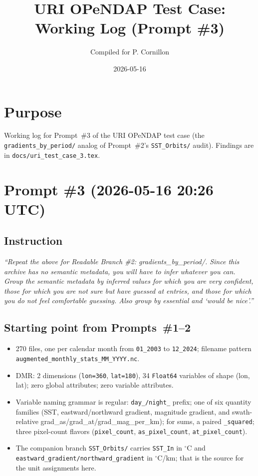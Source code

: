 \documentclass[11pt]{article}
\title{URI OPeNDAP Test Case: Working Log (Prompt \#3)}
\author{Compiled for P. Cornillon}
\date{2026-05-16}
\begin{document}
\maketitle

\section*{Purpose}

Working log for Prompt~\#3 of the URI OPeNDAP test case (the
\texttt{gradients\_by\_period/} analog of Prompt~\#2's
\texttt{SST\_Orbits/} audit). Findings are in
\texttt{docs/uri\_test\_case\_3.tex}.

\section{Prompt \#3 (2026-05-16 20:26 UTC)}

\subsection{Instruction}

\emph{``Repeat the above for Readable Branch \#2:
gradients\_by\_period/. Since this archive has no semantic metadata,
you will have to infer whatever you can. Group the semantic
metadata by inferred values for which you are very confident, those
for which you are not sure but have guessed at entries, and those
for which you do not feel comfortable guessing. Also group by
essential and `would be nice'.''}

\subsection{Starting point from Prompts~\#1--2}

\begin{itemize}
  \item 270 files, one per calendar month from \texttt{01\_2003}
    to \texttt{12\_2024}; filename pattern
    \texttt{augmented\_monthly\_stats\_MM\_YYYY.nc}.
  \item DMR: 2 dimensions (\texttt{lon=360}, \texttt{lat=180}),
    34 \texttt{Float64} variables of shape (lon, lat); zero
    global attributes; zero variable attributes.
  \item Variable naming grammar is regular:
    \texttt{day\_/night\_} prefix; one of six quantity families
    (SST, eastward/northward gradient, magnitude gradient, and
    swath-relative grad\_as/grad\_at/grad\_mag\_per\_km); for sums,
    a paired \texttt{\_squared}; three pixel-count flavors
    (\texttt{pixel\_count}, \texttt{as\_pixel\_count},
    \texttt{at\_pixel\_count}).
  \item The companion branch \texttt{SST\_Orbits/} carries
    \texttt{SST\_In} in $^\circ$C and
    \texttt{eastward\_gradient/northward\_gradient} in $^\circ$C/km;
    that is the source for the unit assignments here.
\end{itemize}
\end{document}
